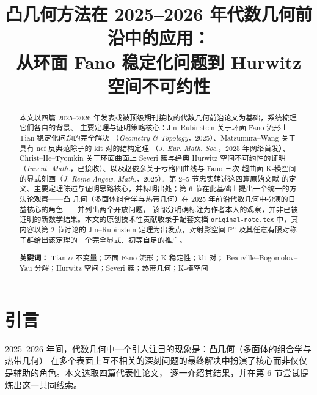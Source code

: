 \documentclass[11pt,a4paper]{article}
\title{\textbf{凸几何方法在 2025--2026 年代数几何前沿中的应用：\\
从环面 Fano 稳定化问题到 Hurwitz 空间不可约性}}
\author{}
\date{}
\theoremstyle{definition}
\theoremstyle{remark}
\newcommand{\PP}{\mathbb{P}}
\begin{document}
\maketitle
\vspace{-1.5em}

\begin{abstract}
本文以四篇 2025--2026 年发表或被顶级期刊接收的代数几何前沿论文为基础，系统梳理它们各自的背景、
主要定理与证明策略核心：Jin--Rubinstein 关于环面 Fano 流形上 Tian 稳定化问题的完全解决
（\emph{Geometry \& Topology}，2025）、Matsumura--Wang 关于具有 nef 反典范除子的 klt 对的结构定理
（\emph{J. Eur. Math. Soc.}，2025 年网络首发）、Christ--He--Tyomkin 关于环面曲面上 Severi 簇与经典
Hurwitz 空间不可约性的证明（\emph{Invent. Math.}，已接收）、以及赵俊彦关于亏格四曲线与 Fano 三次
超曲面 K-模空间的显式刻画（\emph{J. Reine Angew. Math.}，2025）。第 2--5 节忠实转述这四篇原始文献
的定义、主要定理陈述与证明思路核心，并标明出处；第 6 节在此基础上提出一个统一的方法论观察——凸
几何（多面体组合学与热带几何）在 2025 年前沿代数几何中扮演的日益核心的角色——并列出两个开放问题，
该部分明确标注为作者本人的观察，并非已被证明的新数学结果。本文的原创技术性贡献收录于配套文档
\texttt{original-note.tex} 中，其内容以第 2 节讨论的 Jin--Rubinstein 定理为出发点，对射影空间
$\PP^n$ 及其任意有限对称子群给出该定理的一个完全显式、初等自足的推广。

\medskip
\noindent\textbf{关键词：} Tian $\alpha$-不变量；环面 Fano 流形；K-稳定性；klt 对；
Beauville--Bogomolov--Yau 分解；Hurwitz 空间；Severi 簇；热带几何；K-模空间
\end{abstract}

\tableofcontents

\section{引言}

2025--2026 年间，代数几何中一个引人注目的现象是：\textbf{凸几何}（多面体的组合学与热带几何）
在多个表面上互不相关的深刻问题的最终解决中扮演了核心而非仅仅是辅助的角色。本文选取四篇代表性论文，
逐一介绍其结果，并在第 6 节尝试提炼出这一共同线索。
\end{document}
